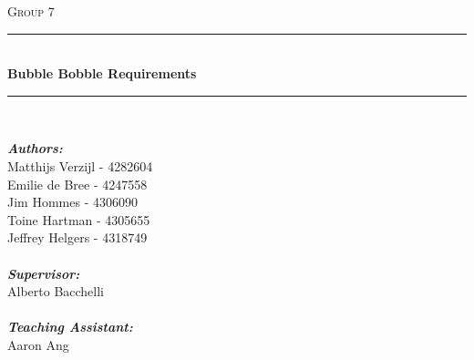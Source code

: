 \begin{titlepage}

\newcommand{\HRule}{\rule{\linewidth}{0.5mm}} %

\center %
 

\textsc{\LARGE Group 7}\\[1.5cm] %


\HRule \\[0.4cm]
{ \huge \bfseries Bubble Bobble Requirements}\\[0.4cm] %
\HRule \\[4cm]
 

\begin{minipage}{0.5\textwidth}
\textbf{\emph{Authors:}}\\          
Matthijs Verzijl - 4282604\\
Emilie de Bree - 4247558\\
Jim Hommes - 4306090\\
Toine Hartman - 4305655\\
Jeffrey Helgers - 4318749 \\\\
\textbf{\emph{Supervisor:}} \\
Alberto Bacchelli \\\\
\textbf{\emph{Teaching Assistant:}} \\
Aaron Ang\\
\end{minipage}\\[5cm]




\end{titlepage}
